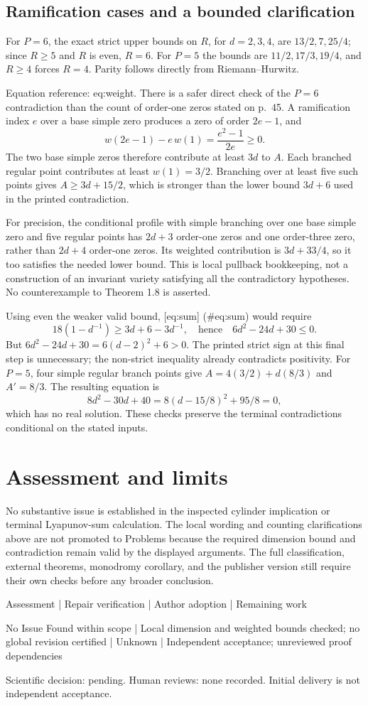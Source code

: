 \documentclass[10pt]{article}
\begin{document}
\subsection*{Ramification cases and a bounded clarification}
For \(P=6\), the exact strict upper bounds on \(R\), for \(d=2,3,4\), are \(13/2,7,25/4\); since \(R\geq5\) and \(R\) is even, \(R=6\). For \(P=5\) the bounds are \(11/2,17/3,19/4\), and \(R\geq4\) forces \(R=4\). Parity follows directly from Riemann–Hurwitz.\par
Equation reference: eq:weight. There is a safer direct check of the \(P=6\) contradiction than the count of order-one zeros stated on p. 45. A ramification index \(e\) over a base simple zero produces a zero of order \(2e-1\), and \[
 w(2e-1)-e\,w(1)=\frac{e^2-1}{2e}\geq0.\] The two base simple zeros therefore contribute at least \(3d\) to \(A\). Each branched regular point contributes at least \(w(1)=3/2\). Branching over at least five such points gives \(A\geq3d+15/2\), which is stronger than the lower bound \(3d+6\) used in the printed contradiction.\par
For precision, the conditional profile with simple branching over one base simple zero and five regular points has \(2d+3\) order-one zeros and one order-three zero, rather than \(2d+4\) order-one zeros. Its weighted contribution is \(3d+33/4\), so it too satisfies the needed lower bound. This is local pullback bookkeeping, not a construction of an invariant variety satisfying all the contradictory hypotheses. No counterexample to Theorem 1.8 is asserted.\par
Using even the weaker valid bound, [eq:sum] (\#eq:sum) would require \[18(1-d^{-1})\geq3d+6-3d^{-1},
 \quad\text{hence}\quad
 6d^2-24d+30\leq0.\] But \(6d^2-24d+30=6(d-2)^2+6>0\). The printed strict sign at this final step is unnecessary; the non-strict inequality already contradicts positivity. For \(P=5\), four simple regular branch points give \(A=4(3/2)+d(8/3)\) and \(A'=8/3\). The resulting equation is \[8d^2-30d+40=8(d-15/8)^2+95/8=0,\] which has no real solution. These checks preserve the terminal contradictions conditional on the stated inputs.\par
\section*{Assessment and limits}
No substantive issue is established in the inspected cylinder implication or terminal Lyapunov-sum calculation. The local wording and counting clarifications above are not promoted to Problems because the required dimension bound and contradiction remain valid by the displayed arguments. The full classification, external theorems, monodromy corollary, and the publisher version still require their own checks before any broader conclusion.\par
Assessment | Repair verification | Author adoption | Remaining work\par
No Issue Found within scope | Local dimension and weighted bounds checked; no global revision certified | Unknown | Independent acceptance; unreviewed proof dependencies\par
Scientific decision: pending. Human reviews: none recorded. Initial delivery is not independent acceptance.\par
\end{document}
